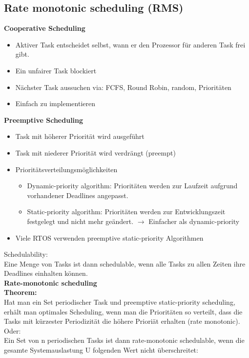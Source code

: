 \subsection{Rate monotonic scheduling (RMS)}
\textbf{Cooperative Scheduling}
  \begin{itemize}
    \item Aktiver Task entscheidet selbst, wann er den Prozessor für anderen
    Task frei gibt. 
    \item Ein unfairer Task blockiert
    \item Nächster Task aussuchen via: FCFS, Round Robin, random, Prioritäten
    \item Einfach zu implementieren
  \end{itemize}
\textbf{Preemptive Scheduling}
  \begin{itemize}
    \item Task mit höherer Priorität wird ausgeführt
    \item Task mit niederer Priorität wird verdrängt (preempt)
    \item Prioritätsverteilungsmöglichkeiten
      \begin{itemize}
        \item Dynamic-priority algorithm: Prioritäten werden zur Laufzeit
        aufgrund vorhandener Deadlines angepasst. 
        \item Static-priority algorithm: Prioritäten werden zur Entwicklungszeit
        festgelegt und nicht mehr geändert. $\rightarrow$ Einfacher als
        dynamic-priority
      \end{itemize}
    \item Viele RTOS verwenden preemptive static-priority Algorithmen 
  \end{itemize}
Schedulability:\\ Eine Menge von Tasks ist dann schedulable, wenn alle Tasks zu
allen Zeiten ihre Deadlines einhalten können.\\
\textbf{Rate-monotonic scheduling}\\
\textbf{Theorem:}\\
Hat man ein Set periodischer Task und preemptive static-priority scheduling,
erhält man optimales Scheduling, wenn man die Prioritäten so verteilt, dass die
Tasks mit kürzester Periodizität die höhere Prioriät erhalten (rate
monotonic).\\
Oder:\\ 
Ein Set von n periodischen Tasks ist dann rate-monotonic schedulable, wenn die
gesamte Systemauslastung U folgenden Wert nicht überschreitet: 
